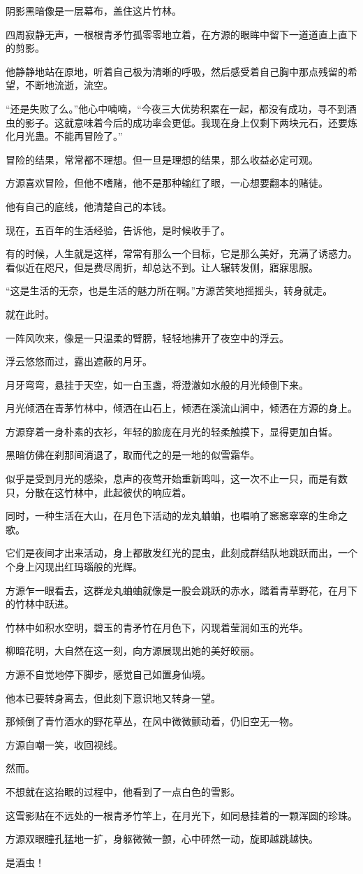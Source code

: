 \begin{this_body}
阴影黑暗像是一层幕布，盖住这片竹林。

四周寂静无声，一根根青矛竹孤零零地立着，在方源的眼眸中留下一道道直上直下的剪影。

他静静地站在原地，听着自己极为清晰的呼吸，然后感受着自己胸中那点残留的希望，不断地流逝，流空。

“还是失败了么。”他心中喃喃，“今夜三大优势积累在一起，都没有成功，寻不到酒虫的影子。这就意味着今后的成功率会更低。我现在身上仅剩下两块元石，还要炼化月光蛊。不能再冒险了。”

冒险的结果，常常都不理想。但一旦是理想的结果，那么收益必定可观。

方源喜欢冒险，但他不嗜赌，他不是那种输红了眼，一心想要翻本的赌徒。

他有自己的底线，他清楚自己的本钱。

现在，五百年的生活经验，告诉他，是时候收手了。

有的时候，人生就是这样，常常有那么一个目标，它是那么美好，充满了诱惑力。看似近在咫尺，但是费尽周折，却总达不到。让人辗转发侧，寤寐思服。

“这是生活的无奈，也是生活的魅力所在啊。”方源苦笑地摇摇头，转身就走。

就在此时。

一阵风吹来，像是一只温柔的臂膀，轻轻地拂开了夜空中的浮云。

浮云悠悠而过，露出遮蔽的月牙。

月牙弯弯，悬挂于天空，如一白玉盏，将澄澈如水般的月光倾倒下来。

月光倾洒在青茅竹林中，倾洒在山石上，倾洒在溪流山涧中，倾洒在方源的身上。

方源穿着一身朴素的衣衫，年轻的脸庞在月光的轻柔触摸下，显得更加白皙。

黑暗仿佛在刹那间消退了，取而代之的是一地的似雪霜华。

似乎是受到月光的感染，息声的夜莺开始重新鸣叫，这一次不止一只，而是有数只，分散在这竹林中，此起彼伏的响应着。

同时，一种生活在大山，在月色下活动的龙丸蛐蛐，也唱响了窸窸窣窣的生命之歌。

它们是夜间才出来活动，身上都散发红光的昆虫，此刻成群结队地跳跃而出，一个个身上闪现出红玛瑙般的光辉。

方源乍一眼看去，这群龙丸蛐蛐就像是一股会跳跃的赤水，踏着青草野花，在月下的竹林中跃进。

竹林中如积水空明，碧玉的青矛竹在月色下，闪现着莹润如玉的光华。

柳暗花明，大自然在这一刻，向方源展现出她的美好皎丽。

方源不自觉地停下脚步，感觉自己如置身仙境。

他本已要转身离去，但此刻下意识地又转身一望。

那倾倒了青竹酒水的野花草丛，在风中微微颤动着，仍旧空无一物。

方源自嘲一笑，收回视线。

然而。

不想就在这抬眼的过程中，他看到了一点白色的雪影。

这雪影贴在不远处的一根青矛竹竿上，在月光下，如同悬挂着的一颗浑圆的珍珠。

方源双眼瞳孔猛地一扩，身躯微微一颤，心中砰然一动，旋即越跳越快。

是酒虫！

\end{this_body}

